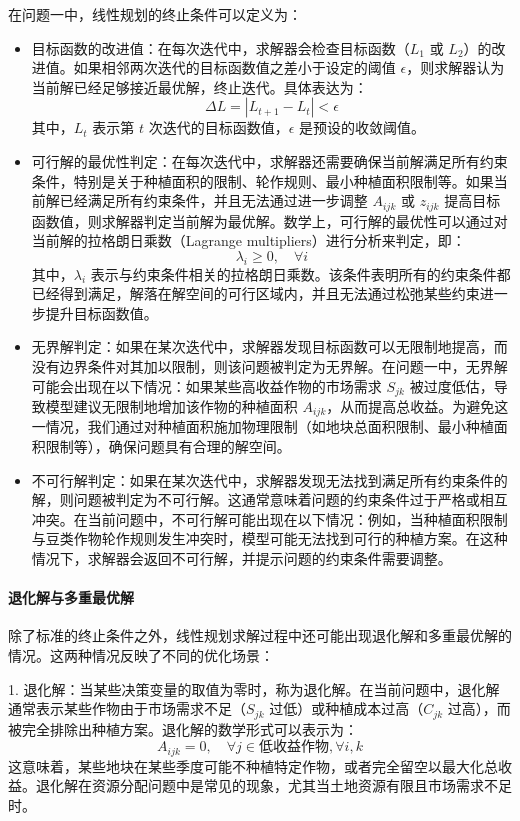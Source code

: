 \documentclass[12pt,a4paper]{nmmcm}
\begin{document}
在问题一中，线性规划的终止条件可以定义为：
\begin{itemize}
    \item 目标函数的改进值：在每次迭代中，求解器会检查目标函数（$L_1$ 或 $L_2$）的改进值。如果相邻两次迭代的目标函数值之差小于设定的阈值 $\epsilon$，则求解器认为当前解已经足够接近最优解，终止迭代。具体表达为：
    \[
    \Delta L = |L_{t+1} - L_t| < \epsilon
    \]
    其中，$L_t$ 表示第 $t$ 次迭代的目标函数值，$\epsilon$ 是预设的收敛阈值。

    \item 可行解的最优性判定：在每次迭代中，求解器还需要确保当前解满足所有约束条件，特别是关于种植面积的限制、轮作规则、最小种植面积限制等。如果当前解已经满足所有约束条件，并且无法通过进一步调整 $A_{ijk}$ 或 $z_{ijk}$ 提高目标函数值，则求解器判定当前解为最优解。数学上，可行解的最优性可以通过对当前解的拉格朗日乘数（Lagrange multipliers）进行分析来判定，即：
    \[
    \lambda_i \geq 0, \quad \forall i
    \]
    其中，$\lambda_i$ 表示与约束条件相关的拉格朗日乘数。该条件表明所有的约束条件都已经得到满足，解落在解空间的可行区域内，并且无法通过松弛某些约束进一步提升目标函数值。

    \item 无界解判定：如果在某次迭代中，求解器发现目标函数可以无限制地提高，而没有边界条件对其加以限制，则该问题被判定为无界解。在问题一中，无界解可能会出现在以下情况：如果某些高收益作物的市场需求 $S_{jk}$ 被过度低估，导致模型建议无限制地增加该作物的种植面积 $A_{ijk}$，从而提高总收益。为避免这一情况，我们通过对种植面积施加物理限制（如地块总面积限制、最小种植面积限制等），确保问题具有合理的解空间。

    \item 不可行解判定：如果在某次迭代中，求解器发现无法找到满足所有约束条件的解，则问题被判定为不可行解。这通常意味着问题的约束条件过于严格或相互冲突。在当前问题中，不可行解可能出现在以下情况：例如，当种植面积限制与豆类作物轮作规则发生冲突时，模型可能无法找到可行的种植方案。在这种情况下，求解器会返回不可行解，并提示问题的约束条件需要调整。
\end{itemize}

\paragraph{退化解与多重最优解}

除了标准的终止条件之外，线性规划求解过程中还可能出现退化解和多重最优解的情况。这两种情况反映了不同的优化场景：

1. 退化解：当某些决策变量的取值为零时，称为退化解。在当前问题中，退化解通常表示某些作物由于市场需求不足（$S_{jk}$ 过低）或种植成本过高（$C_{jk}$ 过高），而被完全排除出种植方案。退化解的数学形式可以表示为：
   \[
   A_{ijk} = 0, \quad \forall j \in \text{低收益作物}, \forall i, k
   \]
   这意味着，某些地块在某些季度可能不种植特定作物，或者完全留空以最大化总收益。退化解在资源分配问题中是常见的现象，尤其当土地资源有限且市场需求不足时。
\end{document}
